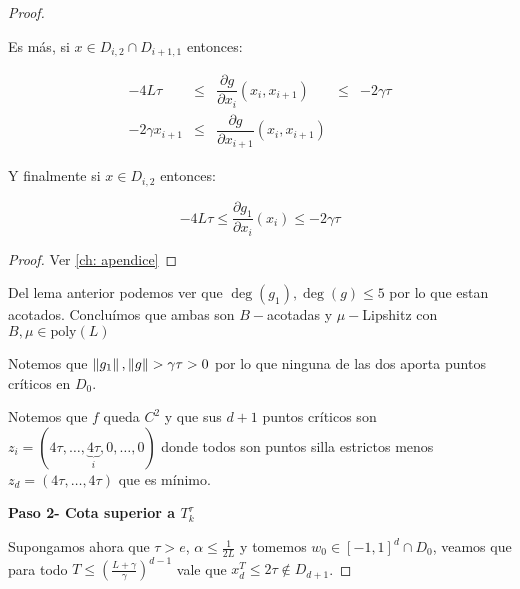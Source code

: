 \begin{proof}
\begin{lemma}
		Es m\'as, si $x \in D_{i,2} \cap D_{i+1,1}$ entonces:
		
		\begin{equation*}
		\begin{aligned}
		-4L\tau & \leq & \dfrac{\partial g}{\partial x_i}(x_i, x_{i+1}) & \leq & -2 \gamma \tau \\
		-2\gamma x_{i+1} & \leq & \dfrac{\partial g}{\partial x_{i+1}}(x_i, x_{i+1}) & &
		\end{aligned}
		\end{equation*}
		
		Y finalmente si $x \in D_{i,2}$ entonces:
		
		\begin{equation*}
			-4L\tau \leq \dfrac{\partial g_1}{\partial x_i}(x_i)  \leq  -2 \gamma \tau 
		\end{equation*}
		
	\end{lemma}

	\begin{proof}
		Ver \ref{ch: apendice}
	\end{proof}

	\begin{remark}
		Del lema anterior podemos ver que $\deg(g_1), \deg(g) \leq 5$ por lo que estan acotados. Conclu\'imos que ambas son $B-$acotadas y $\mu-$Lipshitz con $B, \mu \in \text{poly}(L)$
	\end{remark}

	\begin{remark}
		Notemos que $\left\lVert g_1\right\rVert, \left\lVert g\right\rVert > \gamma \tau > 0$ por lo que ninguna de las dos aporta puntos cr\'iticos en $D_0$.
	\end{remark}

	\begin{remark}
		Notemos que $f$ queda $C^2$ y que sus $d+1$ puntos cr\'iticos son $z_i = \left(4\tau, \dots, \underbrace{4\tau}_{i}, 0, \dots, 0\right)$ donde todos son puntos silla estrictos menos $z_{d} = \left(4\tau, \dots, 4\tau\right)$ que es m\'inimo.
	\end{remark}
	
	\medskip
	
	\textbf{Paso 2- Cota superior a $T_k^{\tau}$}
	
	\medskip
	
	Supongamos ahora que $\tau > e$, $\alpha \leq \frac{1}{2L}$ y tomemos $w_0 \in [-1,1]^d \cap D_0$, veamos que para todo $T \leq \left(\frac{L+ \gamma}{\gamma}\right)^{d-1}$ vale que $x_{d}^T \leq 2\tau \not \in D_{d+1}$.
	

\end{proof}
